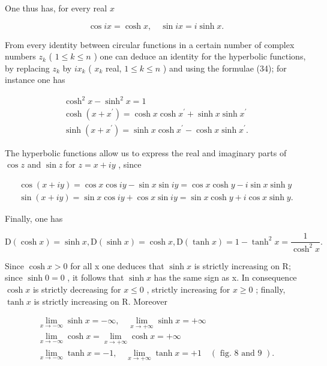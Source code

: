 One thus has, for every real \(x\)

\[
\cos i x = \cosh x, \quad \sin i x = i \sinh x.\tag{34}
\]

From every identity between circular functions in a certain number of complex numbers \(z_{k}\) ( \(1 \leqslant k \leqslant n\) ) one can deduce an identity for the hyperbolic functions, by replacing \(z_{k}\) by \(ix_{k}\) ( \(x_{k}\) real, \(1 \leqslant k \leqslant n\) ) and using the formulae (34); for instance one has

\[
\begin{array}{c} \cosh^ {2} x - \sinh^ {2} x = 1 \\ \cosh (x + x ^ {\prime}) = \cosh x \cosh x ^ {\prime} + \sinh x \sinh x ^ {\prime} \\ \sinh (x + x ^ {\prime}) = \sinh x \cosh x ^ {\prime} - \cosh x \sinh x ^ {\prime}. \end{array}
\]

The hyperbolic functions allow us to express the real and imaginary parts of \(\cos z\) and \(\sin z\) for \(z = x + iy\) , since

\[
\begin{array}{l} \cos (x + i y) = \cos x \cos i y - \sin x \sin i y = \cos x \cosh y - i \sin x \sinh y \\ \sin (x + i y) = \sin x \cos i y + \cos x \sin i y = \sin x \cosh y + i \cos x \sinh y. \end{array}
\]

Finally, one has

\[
\mathrm{D} (\cosh x) = \sinh x, \mathrm{D} (\sinh x) = \cosh x, \mathrm{D} (\tanh x) = 1 - \tanh ^ {2} x = \frac {1}{\cosh^ {2} x}.
\]

Since \(\cosh x > 0\) for all x one deduces that \(\sinh x\) is strictly increasing on R; since \(\sinh 0 = 0\) , it follows that \(\sinh x\) has the same sign as x. In consequence \(\cosh x\) is strictly decreasing for \(x \leqslant 0\) , strictly increasing for \(x \geqslant 0\) ; finally, \(\tanh x\) is strictly increasing on R. Moreover

\[
\begin{array}{l} \lim _ {x \to - \infty} \sinh x = - \infty , \quad \lim _ {x \to + \infty} \sinh x = + \infty \\ \lim _ {x \to - \infty} \cosh x = \lim _ {x \to + \infty} \cosh x = + \infty \\ \lim _ {x \to - \infty} \tanh x = - 1, \quad \lim _ {x \to + \infty} \tanh x = + 1 \quad (\text {   fig.   8   and   9   }). \end{array}
\]

